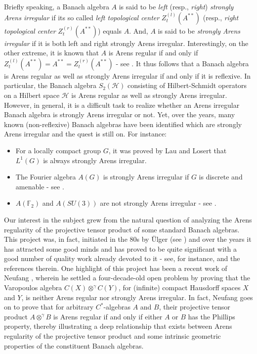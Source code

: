 \documentclass[a4]{amsart}
\theoremstyle{cupthm}
\theoremstyle{cupdefn}
\theoremstyle{cuprem}
\numberwithin{equation}{section}
\newcommand{\obp}{\otimes^{\gamma}}
\newcommand{\mH}{\mathcal{H}}
\begin{document}
Briefly speaking, a Banach algebra $A$ is said to be {\em left}
(resp., {\em right}) {\em strongly Arens irregular} if its so called
{\em left topological center} $Z_t^{(l)} (A^{**})$ (resp., {\em right
  topological center} $Z_t^{(r)} (A^{**})$) equals $A$. And, $A$ is
said to be {\em strongly Arens irregular} if it is both left and right
strongly Arens irregular.  Interestingly, on the other extreme, it is
known that $A$ is Arens regular if and only if $Z_t^{(l)}
(A^{**}) = A^{**} = Z_t^{(r)} (A^{**})$ - see \cite[Page 1]{HN}.  It
thus follows that a Banach algebra is Arens regular as well as
strongly Arens irregular if and only if it is reflexive. In
particular, the Banach algebra $S_2(\mH)$ consisting of Hilbert-Schmidt
operators on a Hilbert space $\mH$ is Arens regular as well as
strongly Arens irregular.  However, in general, it is a difficult task
to realize whether an Arens irregular Banach algebra is strongly Arens
irregular or not. Yet, over the years, many known (non-reflexive)
Banach algebras have been identified which are strongly Arens
irregular and the quest is still on. For instance:
\begin{itemize}
  \item For a locally compact group $G$, it was proved by Lau and
    Losert \cite{Lau-losert} that $L^1(G)$ is always strongly Arens
    irregular.

\item The Fourier algebra $A(G)$ is strongly Arens irregular if $G$ is
  discrete and amenable - see \cite{Lau-Losert2}.
\item $A(\mathbb F_2)$ and $A(SU(3))$ are not strongly Arens
  irregular - see \cite{Losert}.
 
\end{itemize}

Our interest in the subject grew from the natural question of
analyzing the Arens regularity of the projective tensor product of
some standard Banach algebras. This project was, in fact, initiated in
the 80s by \"Ulger (see \cite{Ulger}) and over the years it has attracted
some good minds and has proved to be quite significant with a good
number of quality work already devoted to it - see, for instance,
\cite{Ulger, GI, Neufang, KR} and the references therein. One highlight
of this project has been a recent work of Neufang \cite{Neufang},
wherein he settled a four-decade-old open problem by proving that the
Varopoulos algebra $C(X) \obp C(Y)$, for (infinite) compact Hausdorff
spaces $X$ and $Y$, is neither Arens regular nor strongly Arens
irregular. In fact, Neufang goes on to prove that for arbitrary
$C^*$-algebras $A$ and $B$, their projective tensor product $A \obp B$
is Arens regular if and only if either $A$ or $B$ has the Phillips
property, thereby illustrating a deep relationship that exists between
Arens regularity of the projective tensor product and some intrinsic
geometric properties of the constituent Banach algebras.
\end{document}
